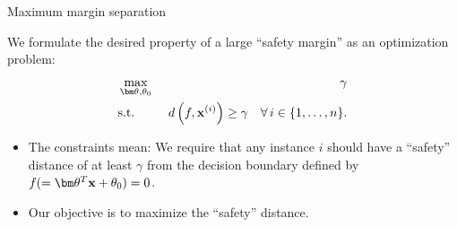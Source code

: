 \documentclass[11pt,compress,t,notes=noshow, xcolor=table]{beamer}
\begin{document}
\begin{vbframe}{Maximum margin separation}

  We formulate the desired property of a large \enquote{safety margin} as an optimization problem:
  \begin{eqnarray*}
    & \max\limits_{\thetav, \theta_0} & \gamma \\
    & \text{s.t.} & \,\, d \left(f, \xi \right) \geq \gamma \quad \forall\, i \in \nset.
    \end{eqnarray*}

    \begin{itemize}
      \item The constraints mean: We require that any instance $i$ should have a \enquote{safety} distance of at least $\gamma$ from the decision boundary defined by $f (= \thetav^T \xv + \theta_0) = 0$.
      \item Our objective is to maximize the \enquote{safety} distance.
    \end{itemize}

\end{vbframe}
\end{document}
